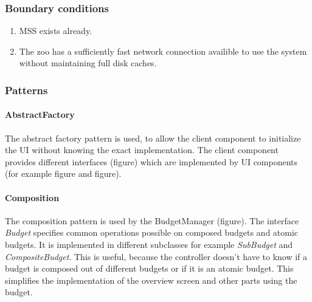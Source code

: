 		\subsubsection{Boundary conditions}
			\begin{enumerate}
				\item MSS exists already.
				\item The zoo has a sufficiently fast network connection availible to use the system without maintaining full disk caches.
			\end{enumerate}
		\subsubsection{Patterns}
			\paragraph{AbstractFactory}
				The abstract factory pattern is used, to allow the client component to initialize the UI without knowing the exact implementation. The client component provides different interfaces (figure) which are implemented by UI components (for example figure and figure).
			\paragraph{Composition}
				The composition pattern is used by the BudgetManager (figure). The interface \emph{Budget} specifies common operations possible on composed budgets and atomic budgets. It is implemented in different subclasses for example \emph{SubBudget} and \emph{CompositeBudget}. This is useful, because the controller doesn't have to know if a budget is composed out of different budgets or if it is an atomic budget. This simplifies the implementation of the overview screen and other parts using the budget.
